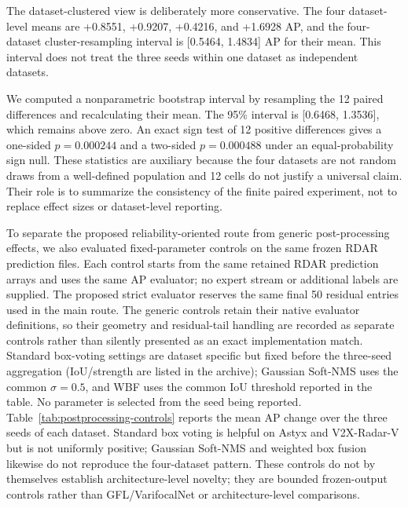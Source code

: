 \documentclass[preprint,12pt,times]{elsarticle}
\begin{document}
The dataset-clustered view is deliberately more conservative. The four
dataset-level means are +0.8551, +0.9207, +0.4216, and +1.6928 AP, and the
four-dataset cluster-resampling interval is [0.5464, 1.4834] AP for their
mean. This interval
does not treat the three seeds within one dataset as independent datasets.

We computed a nonparametric bootstrap interval by resampling the 12 paired
differences and recalculating their mean. The 95\% interval is
[0.6468, 1.3536], which remains above zero. An exact sign test of 12 positive
differences gives a one-sided $p=0.000244$ and a two-sided $p=0.000488$ under
an equal-probability sign null. These statistics are auxiliary because the
four datasets are not random draws from a well-defined population and 12
cells do not justify a universal claim. Their role is to summarize the
consistency of the finite paired experiment, not to replace effect sizes or
dataset-level reporting.

To separate the proposed reliability-oriented route from generic
post-processing effects, we also evaluated fixed-parameter controls on the
same frozen RDAR prediction files. Each control starts from the same retained
RDAR prediction arrays and uses the same AP evaluator; no expert stream or
additional labels are supplied. The proposed strict evaluator reserves the
same final 50 residual entries used in the main route. The generic controls
retain their native evaluator definitions, so their geometry and residual-tail
handling are recorded as separate controls rather than silently presented as
an exact implementation match. Standard box-voting settings are dataset
specific but fixed before the three-seed aggregation (IoU/strength are listed
in the archive); Gaussian Soft-NMS uses the common $\sigma=0.5$, and WBF uses
the common IoU threshold reported in the table. No parameter is selected from
the seed being reported. Table~\ref{tab:postprocessing-controls} reports the
mean AP change over the three seeds of each dataset. Standard box voting is
helpful on Astyx and V2X-Radar-V but is not uniformly positive; Gaussian
Soft-NMS and weighted box fusion likewise do not reproduce the four-dataset
pattern. These controls do not by themselves establish architecture-level
novelty; they are bounded frozen-output controls rather than GFL/VarifocalNet
or architecture-level comparisons.
\end{document}
